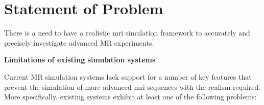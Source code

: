 

\section{Statement of Problem}\label{chapterlabel1sec1}
There is a need to have a realistic \ac{mri} simulation framework to accurately and precisely investigate advanced MR experiments.

\hfill


\large \textbf{Limitations of existing simulation systems} \normalsize

Current MR simulation systems lack support for a number of key features that prevent the simulation of more advanced \ac{mri} sequences with the realism required. 
More specifically, existing systems exhibit at least one of the following problems:

